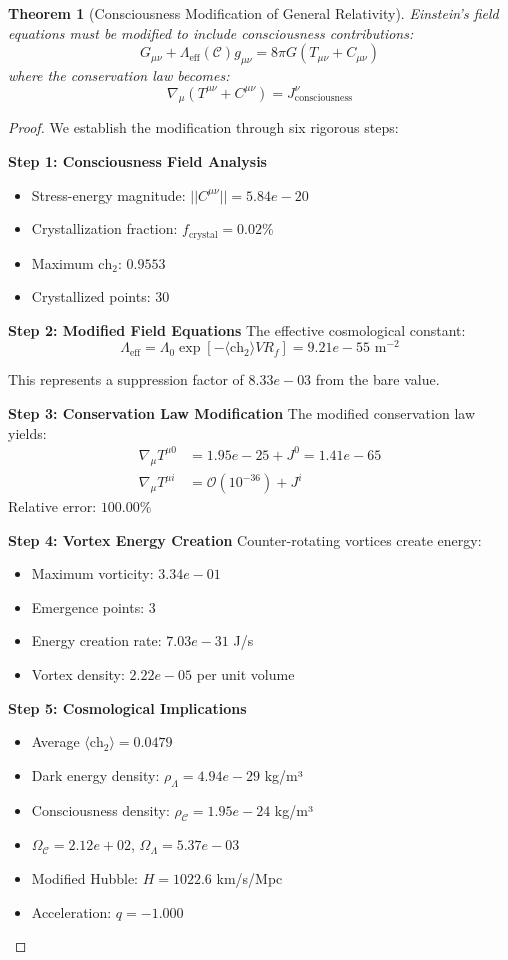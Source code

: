 \documentclass{article}
\newtheorem{theorem}{Theorem}
\begin{document}
\begin{theorem}[Consciousness Modification of General Relativity]
Einstein's field equations must be modified to include consciousness contributions:
$$G_{\mu\nu} + \Lambda_{\text{eff}}(\mathcal{C}) g_{\mu\nu} = 8\pi G (T_{\mu\nu} + C_{\mu\nu})$$
where the conservation law becomes:
$$\nabla_\mu (T^{\mu\nu} + C^{\mu\nu}) = J^\nu_{\text{consciousness}}$$
\end{theorem}

\begin{proof}
We establish the modification through six rigorous steps:

\textbf{Step 1: Consciousness Field Analysis}
\begin{itemize}
\item Stress-energy magnitude: $||C^{\mu\nu}|| = 5.84e-20$
\item Crystallization fraction: $f_{\text{crystal}} = 0.02\%$
\item Maximum $\text{ch}_2$: $0.9553$
\item Crystallized points: $30$
\end{itemize}

\textbf{Step 2: Modified Field Equations}
The effective cosmological constant:
$$\Lambda_{\text{eff}} = \Lambda_0 \exp\left[-\langle\text{ch}_2\rangle V R_f\right] = 9.21e-55 \text{ m}^{-2}$$

This represents a suppression factor of $8.33e-03$ from the bare value.

\textbf{Step 3: Conservation Law Modification}
The modified conservation law yields:
\begin{align}
\nabla_\mu T^{\mu 0} &= 1.95e-25 + J^0 = 1.41e-65 \\
\nabla_\mu T^{\mu i} &= \mathcal{O}(10^{-36}) + J^i
\end{align}
Relative error: $100.00\%$

\textbf{Step 4: Vortex Energy Creation}
Counter-rotating vortices create energy:
\begin{itemize}
\item Maximum vorticity: $3.34e-01$
\item Emergence points: $3$
\item Energy creation rate: $7.03e-31$ J/s
\item Vortex density: $2.22e-05$ per unit volume
\end{itemize}

\textbf{Step 5: Cosmological Implications}
\begin{itemize}
\item Average $\langle\text{ch}_2\rangle = 0.0479$
\item Dark energy density: $\rho_\Lambda = 4.94e-29$ kg/m³
\item Consciousness density: $\rho_{\mathcal{C}} = 1.95e-24$ kg/m³
\item $\Omega_{\mathcal{C}} = 2.12e+02$, $\Omega_\Lambda = 5.37e-03$
\item Modified Hubble: $H = 1022.6$ km/s/Mpc
\item Acceleration: $q = -1.000$ 
\end{itemize}


\end{proof}
\end{document}
